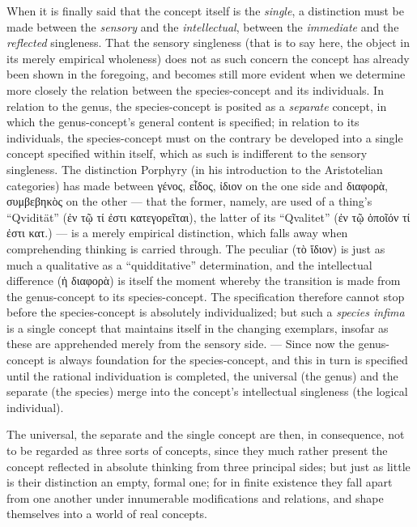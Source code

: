 \documentclass[12pt]{book}
\begin{document}
When it is finally said that the concept itself is the \emph{single}, a
distinction must be made between the \emph{sensory} and the
\emph{intellectual}, between the \emph{immediate} and the \emph{reflected}
singleness. That the sensory singleness (that is to say here, the object in
its merely empirical wholeness) does not as such concern the concept has
already been shown in the foregoing, and becomes still more evident when we
determine more closely the relation between the species-concept and its
individuals. In relation to the genus, the species-concept is posited as a
\emph{separate} concept, in which the genus-concept's general content is
specified; in relation to its individuals, the species-concept must on the
contrary be developed into a single concept specified within itself, which
as such is indifferent to the sensory singleness. The distinction Porphyry
(in his introduction to the Aristotelian categories) has made between γένος,
εἶδος, ἰδιον on the one side and διαφορὰ, συμβεβηκὸς on the other --- that
the former, namely, are used of a thing's ``Qvidität'' (ἐν τῷ τί ἐστι
κατεγορεῖται), the latter of its ``Qvalitet'' (ἐν τῷ ὁποῖόν τί ἐστι κατ.)
--- is a merely empirical distinction, which falls away when comprehending
thinking is carried through. The peculiar (τὸ ἴδιον) is just as much a
qualitative as a ``quidditative'' determination, and the intellectual
difference (ἡ διαφορὰ) is itself the moment whereby the transition is made
from the genus-concept to its species-concept. The specification therefore
cannot stop before the species-concept is absolutely individualized; but
such a \textit{species infima} is a single concept that maintains itself in
the changing exemplars, insofar as these are apprehended merely from the
sensory side. --- Since now the genus-concept is always foundation for the
species-concept, and this in turn is specified until the rational
individuation is completed, the universal (the genus) and the separate (the
species) merge into the concept's intellectual singleness (the logical
individual).

The universal, the separate and the single concept are then, in consequence,
not to be regarded as three sorts of concepts, since they much rather
present the concept reflected in absolute thinking from three principal
sides; but just as little is their distinction an empty, formal one; for in
finite existence they fall apart from one another under innumerable
modifications and relations, and shape themselves into a world of real
concepts.
\end{document}
